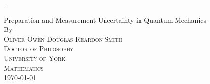 
\begin{titlingpage}
\begin{SingleSpace}
\calccentering{\unitlength} 
\begin{adjustwidth*}{\unitlength}{-\unitlength}
\vspace*{13mm}
\begin{center}
{\HUGE Preparation and Measurement Uncertainty in Quantum Mechanics}\\[4mm]
\vspace{31mm}
{\large By}\\
\vspace{9mm}
{\large\textsc{Oliver Owen Douglas Reardon-Smith}}\\
\vspace{31mm}
{\large
\textsc{Doctor of Philosophy}}\\
\vspace{21mm}
{\large
\textsc{University of York}\\
\textsc{Mathematics}
}\\
\vspace{21mm}
\vspace{9mm}
{\large\textsc{\today}}
\vspace{12mm}
\end{center}
\end{adjustwidth*}
\end{SingleSpace}
\end{titlingpage}